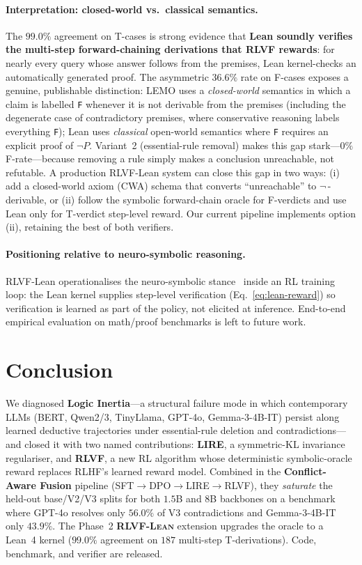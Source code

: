 \documentclass{article} %
\begin{document}
\paragraph{Interpretation: closed-world vs.\ classical semantics.}
The $99.0\%$ agreement on T-cases is strong evidence that \textbf{Lean soundly
verifies the multi-step forward-chaining derivations that RLVF rewards}: for
nearly every query whose answer follows from the premises, Lean kernel-checks
an automatically generated proof. The asymmetric $36.6\%$ rate on F-cases
exposes a genuine, publishable distinction: LEMO uses a \emph{closed-world}
semantics in which a claim is labelled \texttt{F} whenever it is not derivable
from the premises (including the degenerate case of contradictory premises,
where conservative reasoning labels everything \texttt{F}); Lean uses
\emph{classical} open-world semantics where \texttt{F} requires an explicit
proof of $\neg P$. Variant~2 (essential-rule removal) makes this gap
stark---$0\%$ F-rate---because removing a rule simply makes a conclusion
unreachable, not refutable. A production RLVF-Lean system can close this gap
in two ways: (i) add a closed-world axiom (CWA) schema that converts
``unreachable'' to $\neg$\,-derivable, or (ii) follow the symbolic forward-chain
oracle for F-verdicts and use Lean only for T-verdict step-level reward. Our
current pipeline implements option (ii), retaining the best of both verifiers.

\paragraph{Positioning relative to neuro-symbolic reasoning.}
RLVF-Lean operationalises the neuro-symbolic stance~\citep{marcus2019rebooting,davis2024benchmarks,davis2024mathematics,davis2024gpt4o1} inside an RL training loop: the Lean kernel supplies step-level verification (Eq.~\ref{eq:lean-reward}) so verification is learned as part of the policy, not elicited at inference. End-to-end empirical evaluation on math/proof benchmarks is left to future work.

\section{Conclusion}

We diagnosed \textbf{Logic Inertia}---a structural failure mode in which contemporary LLMs (BERT, Qwen2/3, TinyLlama, GPT-4o, Gemma-3-4B-IT) persist along learned deductive trajectories under essential-rule deletion and contradictions---and closed it with two named contributions: \textbf{LIRE}, a symmetric-KL invariance regulariser, and \textbf{\textsc{RLVF}}, a new RL algorithm whose deterministic symbolic-oracle reward replaces RLHF's learned reward model. Combined in the \textbf{Conflict-Aware Fusion} pipeline (SFT$\to$DPO$\to$LIRE$\to$\textsc{RLVF}), they \emph{saturate} the held-out base/V2/V3 splits for both $1.5$B and $8$B backbones on a benchmark where GPT-4o resolves only $56.0\%$ of V3 contradictions and Gemma-3-4B-IT only $43.9\%$. The Phase~2 \textbf{\textsc{RLVF-Lean}} extension upgrades the oracle to a Lean~4 kernel ($99.0\%$ agreement on $187$ multi-step T-derivations). Code, benchmark, and verifier are released.
\end{document}
